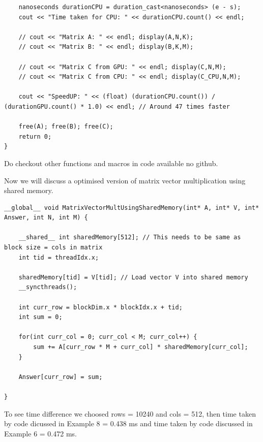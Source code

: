 \documentclass{article}
\begin{document}
\begin{lstlisting}
    nanoseconds durationCPU = duration_cast<nanoseconds> (e - s);
    cout << "Time taken for CPU: " << durationCPU.count() << endl;

    // cout << "Matrix A: " << endl; display(A,N,K);
    // cout << "Matrix B: " << endl; display(B,K,M);
    
    // cout << "Matrix C from GPU: " << endl; display(C,N,M);
    // cout << "Matrix C from CPU: " << endl; display(C_CPU,N,M);

    cout << "SpeedUP: " << (float) (durationCPU.count()) / (durationGPU.count() * 1.0) << endl; // Around 47 times faster

    free(A); free(B); free(C);
    return 0;
}
\end{lstlisting}
Do checkout other functions and macros in code available no github.

Now we will discuss a optimised version of matrix vector multiplication using shared memory.


\begin{lstlisting}
__global__ void MatrixVectorMultUsingSharedMemory(int* A, int* V, int* Answer, int N, int M) {
    
    __shared__ int sharedMemory[512]; // This needs to be same as block size = cols in matrix
    int tid = threadIdx.x;

    sharedMemory[tid] = V[tid]; // Load vector V into shared memory
    __syncthreads();

    int curr_row = blockDim.x * blockIdx.x + tid;
    int sum = 0;

    for(int curr_col = 0; curr_col < M; curr_col++) {
        sum += A[curr_row * M + curr_col] * sharedMemory[curr_col];
    }

    Answer[curr_row] = sum;

}
\end{lstlisting}

To see time difference we choosed rows = 10240 and cols = 512, then time taken by code dicussed in Example 8 = 0.438 ms and time taken by code discussed in Example 6 = 0.472 ms. 
\end{document}
